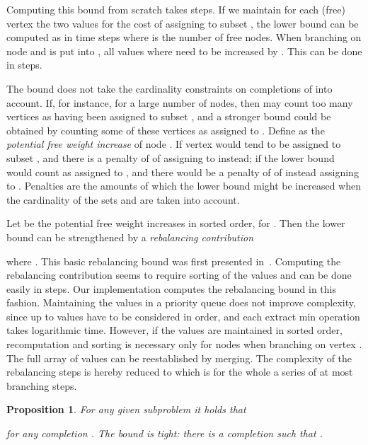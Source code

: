 \documentclass[a4paper,11pt]{article}
\newtheorem{proposition}{Proposition}
\begin{document}
Computing this bound from scratch takes  steps. If we maintain
for each (free) vertex  the two values  for
the cost of assigning  to subset , the lower bound can be
computed as  in  time steps
where  is the number of free nodes. When branching on node 
and  is put into , all values  where  need to be increased by . This can be done in 
steps.

The bound  does not take the cardinality constraints on
completions of  into account. If, for instance,
 for a large number of nodes, then  may
count too many vertices as having been assigned to subset , and a
stronger bound could be obtained by counting some of these vertices as
assigned to . Define  as the \emph{potential free weight
  increase} of node . If  vertex  would tend to be
assigned to subset , and there is a penalty of  of
assigning  to  instead; if  the lower bound
 would count  as assigned to , and there would be
a penalty of  of instead assigning  to . Penalties
are the amounts of which the lower bound might be increased when the
cardinality of the sets  and  are
taken into account. 


Let  be the potential free weight increases in
sorted order,  for . Then the
lower bound can be strengthened by a \emph{rebalancing contribution}

where . This basic rebalancing bound was first
presented in~\cite{Traff91:or,Traff94:ppl}. Computing the rebalancing
contribution seems to require sorting of the 
values and can be done easily in  steps. Our
implementation computes the rebalancing bound in this
fashion. Maintaining the  values in a priority queue does
not improve complexity, since up to  values have to be considered
in order, and each extract min operation takes logarithmic
time. However, if the  values are maintained in sorted
order, recomputation and sorting is necessary only for  nodes
when branching on vertex . The full array of  values can be
reestablished by merging. The complexity of the rebalancing steps is
hereby reduced to  which is 
for the whole a series of at most  branching steps.

\begin{proposition}
\label{prop:rebalancing}
For any given subproblem  it holds that

for any completion . The bound is \emph{tight}: there is a
completion  such that .
\end{proposition}
\end{document}
